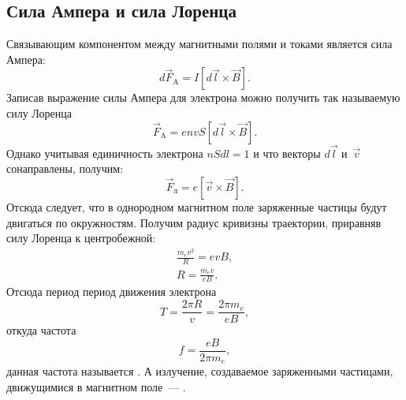\subsection{Сила Ампера и сила Лоренца}

Связывающим компонентом между магнитными полями и токами является сила Ампера:
\begin{equation}
	d\vec{F}_\text{A} = I [ d \vec{l} \times \vec{B} ].
\end{equation}
Записав выражение силы Ампера для электрона можно получить так называемую силу Лоренца
\begin{equation*}
	\vec{F}_\text{A} = e n v S [ d\vec{l} \times \vec{B} ].
\end{equation*}
Однако учитывая единичность электрона $nSdl=1$ и что векторы $d\vec{l}$ и~$\vec{v}$ сонаправлены, получим:
\begin{equation}
	\vec{F}_\text{л} = e [ \vec{v} \times \vec{B} ].
\end{equation}
Отсюда следует, что в однородном магнитном поле заряженные частицы будут двигаться по окружностям. Получим радиус кривизны траектории, приравняв силу Лоренца к центробежной:
\begin{gather}
	\frac{m_e v^2}{R} = e v B \nonumber,\\
	R = \frac{m_e v}{e B}.
\end{gather}
Отсюда период период движения электрона
\begin{equation}
    T = \frac{2 \pi R}{v} = \frac{2 \pi m_e}{e B},
\end{equation}
откуда частота
\begin{equation}
	f = \frac{e B}{2 \pi m_e},
\end{equation}
данная частота называется . А излучение, создаваемое заряженными частицами, движущимися в магнитном поле~--- .
